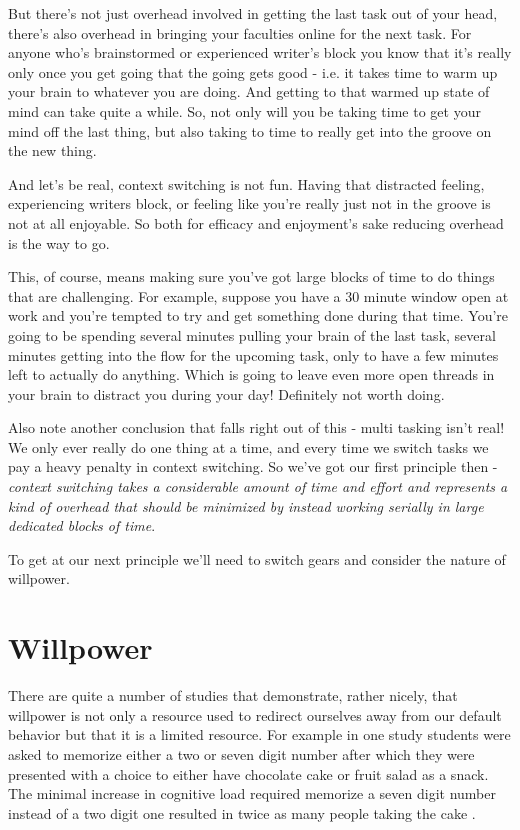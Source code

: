 \documentclass[11pt,a5paper]{book}
\begin{document}
But there's not just overhead involved in getting the last task out of your head, there's also overhead in bringing your faculties online for the next task. For anyone who's brainstormed or experienced writer's block you know that it's really only once you get going that the going gets good - i.e. it takes time to warm up your brain to whatever you are doing. And getting to that warmed up state of mind can take quite a while. So, not only will you be taking time to get your mind off the last thing, but also taking to time to really get into the groove on the new thing. 
\newline

And let's be real, context switching is not fun. Having that distracted feeling, experiencing writers block, or feeling like you're really just not in the groove is not at all enjoyable. So both for efficacy and enjoyment's sake reducing overhead is the way to go. 
\newline

This, of course, means making sure you've got large blocks of time to do things that are challenging. For example, suppose you have a 30 minute window open at work and you're tempted to try and get something done during that time. You're going to be spending several minutes pulling your brain of the last task, several minutes getting into the flow for the upcoming task, only to have a few minutes left to actually do anything. Which is going to leave even more open threads in your brain to distract you during your day! Definitely not worth doing. 
\newline

Also note another conclusion that falls right out of this - multi tasking isn't real! We only ever really do one thing at a time, and every time we switch tasks we pay a heavy penalty in context switching. So we've got our first principle then - \textit{context switching takes a considerable amount of time and effort and represents a kind of overhead that should be minimized by instead working serially in large dedicated blocks of time}.
\newline

To get at our next principle we'll need to switch gears and consider the nature of willpower.

\section{Willpower}
There are quite a number of studies that demonstrate, rather nicely, that willpower is not only a resource used to redirect ourselves away from our default behavior but that it is a limited resource. For example in one study students were asked to memorize either a two or seven digit number after which they were presented with a choice to either have chocolate cake or fruit salad as a snack. The minimal increase in cognitive load required memorize a seven digit number instead of a two digit one resulted in twice as many people taking the cake \cite{keller}. 
\newline
\end{document}
